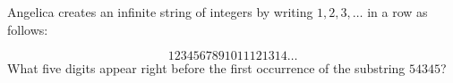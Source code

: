Angelica creates an infinite string of integers by writing $1,2,3,\dots$ in a row as follows:

$$1234567891011121314\dots$$What five digits appear right before the first occurrence of the substring $54345$?
